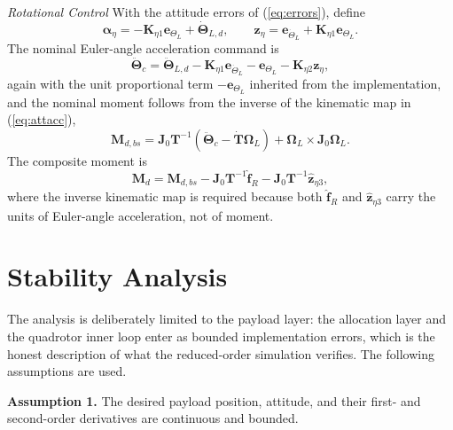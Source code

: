 \documentclass[Review,sageh,times]{sagej}
\begin{document}
\emph{Rotational Control} With the attitude errors of (\ref{eq:errors}), define
\begin{equation}
\boldsymbol{\alpha}_\eta = -\mathbf{K}_{\eta1}\mathbf{e}_{\Theta_L} + \dot{\boldsymbol{\Theta}}_{L,d},
\qquad
\mathbf{z}_\eta = \mathbf{e}_{\dot\Theta_L} + \mathbf{K}_{\eta1}\mathbf{e}_{\Theta_L}.
\label{eq:alphaeta}
\end{equation}
The nominal Euler-angle acceleration command is
\begin{equation}
\ddot{\boldsymbol{\Theta}}_{c} = \ddot{\boldsymbol{\Theta}}_{L,d}
- \mathbf{K}_{\eta1}\mathbf{e}_{\dot\Theta_L} - \mathbf{e}_{\Theta_L}
- \mathbf{K}_{\eta2}\mathbf{z}_\eta,
\label{eq:etaddot}
\end{equation}
again with the unit proportional term $-\mathbf{e}_{\Theta_L}$ inherited from the
implementation, and the nominal moment follows from the inverse of the
kinematic map in (\ref{eq:attacc}),
\begin{equation}
\mathbf{M}_{d,bs} = \mathbf{J}_0\mathbf{T}^{-1}\left(\ddot{\boldsymbol{\Theta}}_{c}
- \dot{\mathbf{T}}\boldsymbol{\Omega}_L\right) + \boldsymbol{\Omega}_L\times\mathbf{J}_0\boldsymbol{\Omega}_L .
\label{eq:Mdbs}
\end{equation}
The composite moment is
\begin{equation}
\mathbf{M}_d = \mathbf{M}_{d,bs}
- \mathbf{J}_0\mathbf{T}^{-1}\hat{\mathbf{f}}_R
- \mathbf{J}_0\mathbf{T}^{-1}\hat{\mathbf{z}}_{\eta3},
\label{eq:Md}
\end{equation}
where the inverse kinematic map is required because both
$\hat{\mathbf{f}}_R$ and $\hat{\mathbf{z}}_{\eta3}$ carry the units of Euler-angle
acceleration, not of moment.

\section*{Stability Analysis}

The analysis is deliberately limited to the payload layer: the allocation
layer and the quadrotor inner loop enter as bounded implementation errors,
which is the honest description of what the reduced-order simulation
verifies. The following assumptions are used.

\medskip
\noindent\textbf{Assumption 1.} The desired payload position, attitude, and their
first- and second-order derivatives are continuous and bounded.
\end{document}
